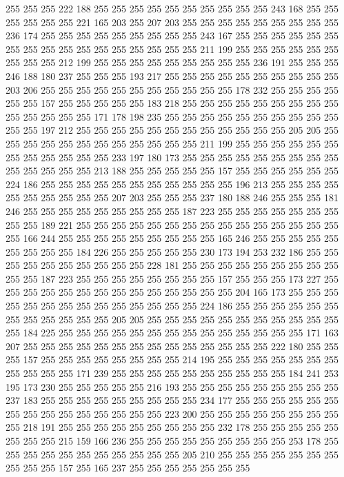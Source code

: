 255 255 255 222 188 255 255 255 255 255 255 255 255 255 255 243 168 255 255 255
255 255 255 221 165 203 255 207 203 255 255 255 255 255 255 255 255 255 236 174
255 255 255 255 255 255 255 255 255 243 167 255 255 255 255 255 255 255 255 255
255 255 255 255 255 255 255 255 211 199 255 255 255 255 255 255 255 255 255 212
199 255 255 255 255 255 255 255 255 255 236 191 255 255 255 246 188 180 237 255
255 255 193 217 255 255 255 255 255 255 255 255 255 255 203 206 255 255 255 255
255 255 255 255 255 255 255 178 232 255 255 255 255 255 255 157 255 255 255 255
255 183 218 255 255 255 255 255 255 255 255 255 255 255 255 255 255 171 178 198
235 255 255 255 255 255 255 255 255 255 255 255 255 197 212 255 255 255 255 255
255 255 255 255 255 255 255 205 205 255 255 255 255 255 255 255 255 255 255 255
255 211 199 255 255 255 255 255 255 255 255 255 255 255 255 233 197 180 173 255
255 255 255 255 255 255 255 255 255 255 255 255 255 213 188 255 255 255 255 255
157 255 255 255 255 255 255 224 186 255 255 255 255 255 255 255 255 255 255 255
196 213 255 255 255 255 255 255 255 255 255 255 207 203 255 255 255 237 180 188
246 255 255 255 181 246 255 255 255 255 255 255 255 255 255 187 223 255 255 255
255 255 255 255 255 255 189 221 255 255 255 255 255 255 255 255 255 255 255 255
255 255 255 255 166 244 255 255 255 255 255 255 255 255 255 165 246 255 255 255
255 255 255 255 255 255 184 226 255 255 255 255 255 230 173 194 253 232 186 255
255 255 255 255 255 255 255 255 255 228 181 255 255 255 255 255 255 255 255 255
255 255 187 223 255 255 255 255 255 255 255 255 157 255 255 255 173 227 255 255
255 255 255 255 255 255 255 255 255 255 255 255 204 165 173 255 255 255 255 255
255 255 255 255 255 255 255 255 255 224 186 255 255 255 255 255 255 255 255 255
255 255 255 205 205 255 255 255 255 255 255 255 255 255 255 255 255 184 225 255
255 255 255 255 255 255 255 255 255 255 255 255 255 171 163 207 255 255 255 255
255 255 255 255 255 255 255 255 255 255 222 180 255 255 255 157 255 255 255 255
255 255 255 255 214 195 255 255 255 255 255 255 255 255 255 255 255 171 239 255
255 255 255 255 255 255 255 255 255 184 241 253 195 173 230 255 255 255 255 255
216 193 255 255 255 255 255 255 255 255 255 237 183 255 255 255 255 255 255 255
255 255 234 177 255 255 255 255 255 255 255 255 255 255 255 255 255 255 255 223
200 255 255 255 255 255 255 255 255 255 218 191 255 255 255 255 255 255 255 255
255 232 178 255 255 255 255 255 255 255 255 215 159 166 236 255 255 255 255 255
255 255 255 255 253 178 255 255 255 255 255 255 255 255 255 255 255 205 210 255
255 255 255 255 255 255 255 255 255 157 255 165 237 255 255 255 255 255 255 255
